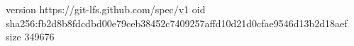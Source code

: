 version https://git-lfs.github.com/spec/v1
oid sha256:fb2d8b8fdcdbd00e79ceb38452c7409257affd10d21d0cfae9546d13b2d18aef
size 349676
